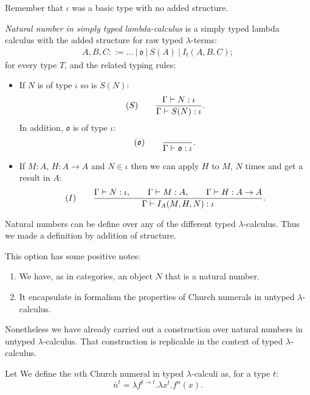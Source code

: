 \begin{definition}
\begin{remark}
  Remember that $\iota$ was a basic type with no added structure.
\end{remark}
\begin{definition}
  \emph{Natural number in simply typed lambda-calculus} is a simply typed lambda calculus with the added structure for raw typed $\lambda$-terms:
  \begin{align*}
    A,B, C ::= ...\ |\ \mathfrak{o}\ |\ S(A)\ |\ I_t(A,B,C);
  \end{align*}
  for every type $T$, and the related typing rules:
  \begin{itemize}
  \item If $N$ is of type $\iota$ so is $S(N)$:
    $$  (S)\qquad  {\displaystyle\Gamma \vdash N:\iota \over \Gamma \vdash S(N):\iota}.$$
    In addition, $\mathfrak{o}$ is of type $\iota$:
    $$  (\mathfrak{o})\qquad  {\displaystyle\over \Gamma \vdash \mathfrak{o}:\iota}.$$
  \item If $M: A$, $H: A\to A$ and $N\in \iota$ then we can apply $H$ to $M$, $N$ times and get a result in $A$:
    $$  (I)\qquad  {\displaystyle\Gamma \vdash N:\iota, \qquad \Gamma \vdash M:A,\qquad \Gamma \vdash H:A\to A \over \Gamma \vdash I_A(M,H,N):\iota}.$$
  \end{itemize}
\end{definition}

\begin{remark} \label{remark-natural-numbers}
  Natural numbers can be define over any of the different typed $\lambda$-calculus. Thus we made a definition by addition of structure. 
\end{remark}

This option has some positive notes:
\begin{enumerate}
\item We have, as in categories, an object $N$ that is a natural number.
\item It encapsulate in formalism the properties of Church numerals in untyped $\lambda$-calculus.
\end{enumerate}

Nonetheless we have already carried out a construction over natural numbers in untyped $\lambda$-calculus. That construction is replicable in the context of typed $\lambda$-calculus.

\begin{definition}
  Let We define the $n$th Church numeral in typed $\lambda$-calculi as, for a type $t$:
  $$\overline n^t = \lambda f^{t \to t}. \lambda x^{t}. f^{n}(x).$$
  

\end{definition}
\end{definition}
